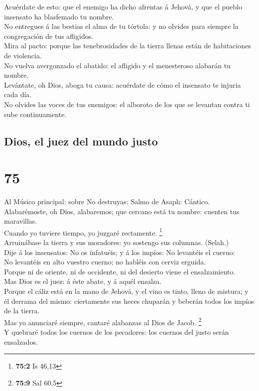  Acuérdate de esto: que el enemigo ha dicho afrentas á
Jehová, y que el pueblo insensato ha blasfemado tu nombre.\\
 No entregues á las bestias el alma de tu tórtola: y no
olvides para siempre la congregación de tus afligidos.\\
 Mira al pacto: porque las tenebrosidades de la tierra
llenas están de habitaciones de violencia.\\
 No vuelva avergonzado el abatido: el afligido y el
menesteroso alabarán tu nombre.\\
 Levántate, oh Dios, aboga tu causa: acuérdate de cómo el
insensato te injuria cada día.\\
 No olvides las voces de tus enemigos: el alboroto de los
que se levantan contra ti sube continuamente.

\hypertarget{dios-el-juez-del-mundo-justo}{%
\subsection{Dios, el juez del mundo
justo}\label{dios-el-juez-del-mundo-justo}}

\hypertarget{section-74}{%
\section{75}\label{section-74}}

 Al Músico principal: sobre No destruyas: Salmo de Asaph:
Cántico. Alabarémoste, oh Dios, alabaremos; que cercano está tu nombre:
cuenten tus maravillas.\\
 Cuando yo tuviere tiempo, yo juzgaré rectamente.
\footnote{\textbf{75:2} Is 46,13}\\
 Arruinábase la tierra y sus moradores: yo sostengo sus
columnas. (Selah.)\\
 Dije á los insensatos: No os infatuéis; y á los impíos: No
levantéis el cuerno:\\
 No levantéis en alto vuestro cuerno; no habléis con cerviz
erguida.\\
 Porque ni de oriente, ni de occidente, ni del desierto
viene el ensalzamiento.\\
 Mas Dios es el juez: á éste abate, y á aquél ensalza.\\
 Porque el cáliz está en la mano de Jehová, y el vino es
tinto, lleno de mistura; y él derrama del mismo: ciertamente sus heces
chuparán y beberán todos los impíos de la tierra.\\
 Mas yo anunciaré siempre, cantaré alabanzas al Dios de
Jacob. \footnote{\textbf{75:9} Sal 60,5}\\
 Y quebraré todos los cuernos de los pecadores: los cuernos
del justo serán ensalzados.

